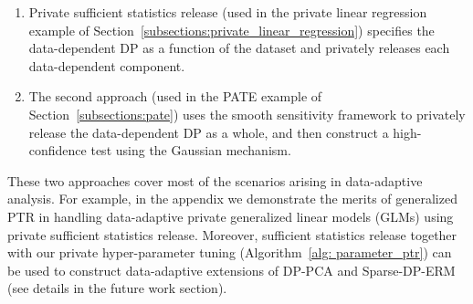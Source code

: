 \begin{enumerate}
    \item Private sufficient statistics release (used in the private linear regression example of Section~\ref{subsections:private_linear_regression}) specifies the data-dependent DP as a function of the dataset and privately releases each data-dependent component. %
    \item The second approach (used in the PATE example of Section~\ref{subsections:pate}) uses the smooth sensitivity framework to privately release the data-dependent DP as a whole, and then construct a high-confidence test using the Gaussian mechanism. %
    
\end{enumerate}
These two approaches cover most of the scenarios arising in data-adaptive analysis. For example, in the appendix we demonstrate the merits of generalized PTR in handling data-adaptive private generalized linear models (GLMs)  using private sufficient statistics release. Moreover, sufficient statistics release together with our private hyper-parameter tuning (Algorithm~\ref{alg: parameter_ptr}) can be used to construct data-adaptive extensions of DP-PCA and Sparse-DP-ERM (see details in the future work section).



